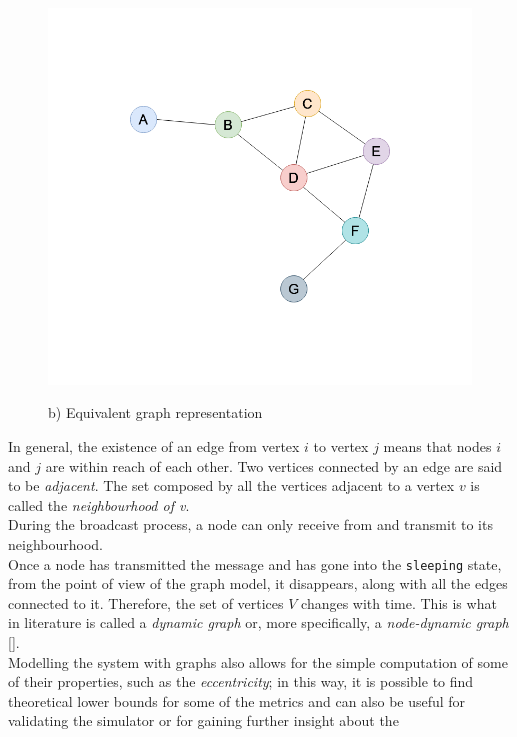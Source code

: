 \begin{figure}[H]
\begin{minipage}{.5\textwidth}
		\includegraphics[scale=.23]{img/wireless_graph_2.png}
		\begin{center}
            b) Equivalent graph representation
        \end{center}
	\end{minipage}
	\caption{}
    \label{fig:graph1}
\end{figure}
\noindent
In general, the existence of an edge from vertex $i$ to vertex $j$ means that
nodes $i$ and $j$ are within reach of each other. Two vertices connected by an
edge are said to be \textit{adjacent}. The set composed by all the vertices
adjacent to a vertex $v$ is called the \textit{neighbourhood of v}.\\
During the broadcast process, a node can only receive
from and transmit to its neighbourhood.\\
Once a node has transmitted the message and has gone into the \texttt{sleeping}
state, from the point of view of the graph model, it disappears, along with all
the edges connected to it. Therefore, the set of vertices $V$ changes with time.
This is what in literature is called a \textit{dynamic graph} or, more
specifically, a \textit{node-dynamic graph} [\cite{hararygraph}].\\
Modelling the system with graphs also allows for the simple computation of some
of their properties, such as the \textit{eccentricity}; in this way, it is
possible to find theoretical lower bounds for some of the metrics and can also
be useful for validating the simulator or for gaining further insight about the
